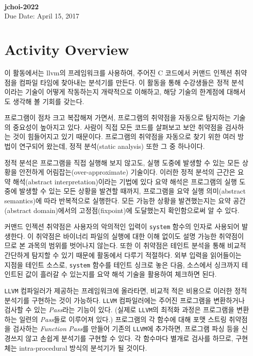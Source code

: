\documentclass[a4paper, 11pt]{article}
\theoremstyle{definition}
\begin{document}
 \\
         {\phantom{} \hfill \textbf{jchoi-2022}} \\
         {\phantom{} \hfill Due Date: April 15, 2017} \\

\section{Activity Overview}
이 활동에서는 llvm의 프레임워크를 사용하여, 주어진 C 코드에서 커맨드 인젝션 취약점을 컴파일 타임에 찾아내는 분석기를 만든다. 이 활동을 통해 수강생들은 정적 분석이라는 기술이 어떻게 작동하는지 개략적으로 이해하고, 해당 기술의 한계점에 대해서도 생각해 볼 기회를 갖는다.

프로그램이 점차 크고 복잡해져 가면서, 프로그램의 취약점을 자동으로 탐지하는 기술의 중요성이 높아지고 있다. 사람이 직접 모든 코드를 살펴보고 보안 취약점을 검사하는 것이 힘들어지고 있기 때문이다. 프로그램의 취약점을 자동으로 찾기 위한 여러 방법이 연구되어 왔는데, 정적 분석(static analysis) 또한 그 중 하나이다. 

정적 분석은 프로그램을 직접 실행해 보지 않고도, 실행 도중에 발생할 수 있는 모든 상황을 안전하게 어림잡는(over-approximate) 기술이다. 이러한 정적 분석의 근간은 요약 해석(abstract interpretation)이라는 기법에 있다\cite{abstract, framework} 요약 해석은 프로그램의 실행 도중에 발생할 수 있는 모든 상황을 발견할 때까지, 프로그램을 요약 실행 의미(abstract semantics)에 따라 반복적으로 실행한다. 모든 가능한 상황을 발견했는지는 요약 공간(abstract domain)에서의 고정점(fixpoint)에 도달했는지 확인함으로써 알 수 있다\cite{PALecture}.

커맨드 인젝션 취약점은 사용자의 악의적인 입력이 \texttt{system} 함수의 인자로 사용되어 발생한다. 이 취약점은 바이너리 파일의 실행에 대한 이해 없이도 설명 가능한 취약점이므로 본 과목의 범위를 벗어나지 않는다. 또한 이 취약점은 테인트 분석을 통해 비교적 간단하게 탐지할 수 있기 때문에 활동에서 다루기 적절하다. 외부 입력을 읽어들이는 지점을 테인트 소스로, \texttt{system} 함수를 테인트 싱크로 놓은 다음, 소스에서 싱크까지 테인트된 값이 흘러갈 수 있는지를 요약 해석 기술을 활용하여 체크하면 된다.

\texttt{LLVM} 컴파일러가 제공하는 프레임워크에 올라타면, 비교적 적은 비용으로 이러한 정적 분석기를 구현하는 것이 가능하다. \texttt{LLVM} 컴파일러에는 주어진 프로그램을 변환하거나 검사할 수 있는 \emph{Pass}라는 기능이 있다\cite{LLVMPass}. (실제로 \texttt{LLVM}의 최적화 과정은 프로그램을 변환하는 일련의 \emph{Pass}들로 이루어져 있다.) 프로그램의 각 함수에 대해 포맷 스트링 취약점을 검사하는 \emph{Function Pass}를 만들어 기존의 \texttt{LLVM}에 추가하면, 프로그램 파싱 등을 신경쓰지 않고 손쉽게 분석기를 구현할 수 있다. 각 함수마다 별개로 검사를 하므로, 구현체는 intra-procedural 방식의 분석기가 될 것이다.
\end{document}
